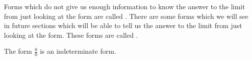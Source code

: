 \documentclass{ximera}
\begin{document}
\begin{definition}
Forms which do not give us enough information to know the answer to
the limit from just looking at the form are called .  There are some forms which we will see in future sections
which will be able to tell us the answer to the limit from just
looking at the form. These forms are called .
\end{definition}  

The form $\frac{0}{0}$ is an indeterminate form.
\end{document}
